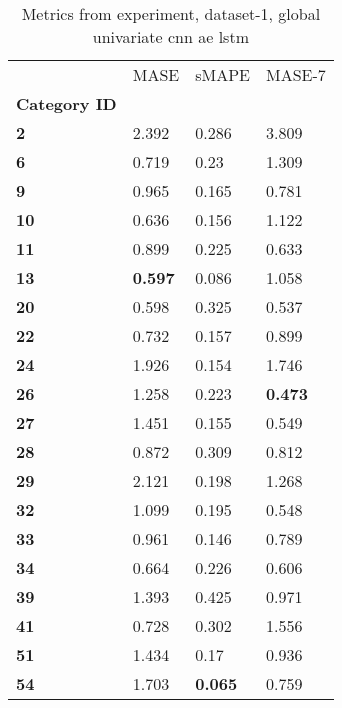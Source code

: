 \begin{table}[H]
\centering
\caption{Metrics from experiment, dataset-1, global univariate cnn ae lstm}
\label{table:global-univariate-cnn-ae-lstm-dataset-1}
\begin{tabular}{llll}
\toprule
{} &            MASE &           sMAPE &          MASE-7 \\
\textbf{Category ID} &                 &                 &                 \\
\midrule
\textbf{2          } &           2.392 &           0.286 &           3.809 \\
\textbf{6          } &           0.719 &            0.23 &           1.309 \\
\textbf{9          } &           0.965 &           0.165 &           0.781 \\
\textbf{10         } &           0.636 &           0.156 &           1.122 \\
\textbf{11         } &           0.899 &           0.225 &           0.633 \\
\textbf{13         } &  \textbf{0.597} &           0.086 &           1.058 \\
\textbf{20         } &           0.598 &           0.325 &           0.537 \\
\textbf{22         } &           0.732 &           0.157 &           0.899 \\
\textbf{24         } &           1.926 &           0.154 &           1.746 \\
\textbf{26         } &           1.258 &           0.223 &  \textbf{0.473} \\
\textbf{27         } &           1.451 &           0.155 &           0.549 \\
\textbf{28         } &           0.872 &           0.309 &           0.812 \\
\textbf{29         } &           2.121 &           0.198 &           1.268 \\
\textbf{32         } &           1.099 &           0.195 &           0.548 \\
\textbf{33         } &           0.961 &           0.146 &           0.789 \\
\textbf{34         } &           0.664 &           0.226 &           0.606 \\
\textbf{39         } &           1.393 &           0.425 &           0.971 \\
\textbf{41         } &           0.728 &           0.302 &           1.556 \\
\textbf{51         } &           1.434 &            0.17 &           0.936 \\
\textbf{54         } &           1.703 &  \textbf{0.065} &           0.759 \\
\bottomrule
\end{tabular}
\end{table}
